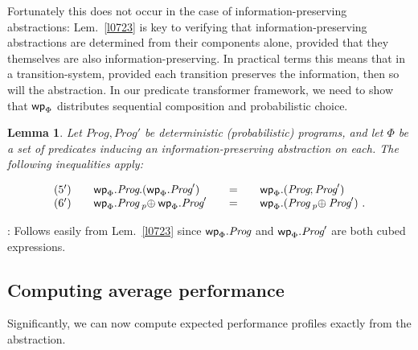 \documentclass[numbers,copyright,creativecommons]{eptcs}
\newcommand{\PC}[1]{\mathbin{\makebox[0em]{~}_{#1}\oplus}}
\newcommand{\Wp}{\mbox{\sf wp}}
\newcommand{\Prog}{\textit{Prog}}
\newcommand{\Wide}[1]{~~~#1~~~}
\newtheorem{Lems}{Lemma} \newcommand{\Lem}[1]{Lem.~\ref{#1}}
\newcommand{\Proof}{\noindent{\bf Proof}: \quad}
\begin{document}
Fortunately this does not occur in the case of information-preserving abstractions: \Lem{l0723} is key to verifying that information-preserving abstractions are determined from their components alone, provided that they themselves are also information-preserving. In practical terms this means that in a transition-system, provided each transition preserves the information, then so will the abstraction. In our predicate transformer framework, we need to show that $\Wp_\Phi$ distributes sequential composition and probabilistic choice.

\begin{Lems}\label{l1626}
Let $\Prog, \Prog'$ be deterministic (probabilistic) programs, and let $\Phi$ be a set of predicates inducing an information-preserving abstraction on each. The following inequalities apply:

\[
\begin{array}{llll}
(5')~~~ & \Wp_\Phi.\Prog . (\Wp_\Phi. \Prog')   &\Wide{=}& \Wp_\Phi.(\Prog ; \Prog')  \\

(6')~~~ &  \Wp_\Phi.\Prog \PC{p} \Wp_\Phi. \Prog'   &\Wide{=}& \Wp_\Phi.(\Prog \PC{p} \Prog') ~. \\
\end{array}
\]

\end{Lems}

\Proof
Follows easily from \Lem{l0723} since $\Wp_\Phi.\Prog$ and $\Wp_\Phi.\Prog'$ are both cubed expressions.




\subsection{Computing average performance}

Significantly, we can now compute expected performance profiles exactly from the abstraction.
\end{document}
